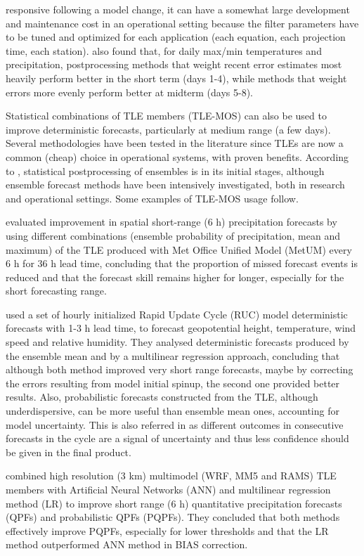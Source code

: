 responsive following a model change, it can have a somewhat large development and maintenance cost in an operational setting because the filter parameters have to be tuned and optimized for each application (each equation, each projection time, each station). \cite{Stull2008} also found that, for daily max/min temperatures and precipitation, postprocessing methods that weight recent error estimates most heavily perform better in the short term (days 1-4), while methods that weight errors more evenly perform better at midterm (days 5-8).

Statistical combinations of TLE members (TLE-MOS) can also be used to improve deterministic forecasts, particularly at medium range (a few days). Several methodologies have been tested in the literature since TLEs are now a common (cheap) choice in operational systems, with proven benefits. According to \cite{Wilks2005}, statistical postprocessing of ensembles is in its initial stages, although ensemble forecast methods have been intensively investigated, both in research and operational settings. Some examples of TLE-MOS usage follow.

\cite{Mittermaier2007} evaluated improvement in spatial short-range (6 h) precipitation forecasts by using different combinations (ensemble probability of precipitation, mean and maximum) of the TLE produced with Met Office Unified Model (MetUM) every 6 h for 36 h lead time, concluding that the proportion of missed forecast events is reduced and that the forecast skill remains higher for longer, especially for the short forecasting range. 

\cite{Lu2007} used a set of hourly initialized Rapid Update Cycle (RUC) model deterministic forecasts with 1-3 h lead time, to forecast geopotential height, temperature, wind speed and relative humidity. They analysed deterministic forecasts produced by the ensemble mean and by a multilinear regression approach, concluding that although both method improved very short range forecasts, maybe by correcting the errors resulting from model initial spinup, the second one provided better results. Also, probabilistic forecasts constructed from the TLE, although underdispersive, can be more useful than ensemble mean ones, accounting for model uncertainty. This is also referred in \cite{Warner2011} as different outcomes in consecutive forecasts in the cycle are a signal of uncertainty and thus less confidence should be given in the final product.

\cite{Yuan2008} combined high resolution (3 km) multimodel (WRF, MM5 and RAMS) TLE members with Artificial Neural Networks (ANN) and \cite{Lu2007} multilinear regression method (LR) to improve short range (6 h) quantitative precipitation forecasts (QPFs) and probabilistic QPFs (PQPFs). They concluded that both methods effectively improve PQPFs, especially for lower thresholds and that the LR method outperformed ANN method in BIAS correction. 

